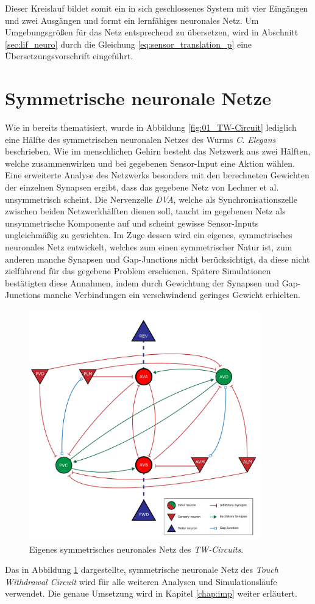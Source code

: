 	Dieser Kreislauf bildet somit ein in sich geschlossenes System mit vier Eingängen und zwei Ausgängen und formt ein lernfähiges neuronales Netz. Um Umgebungsgrößen für das Netz entsprechend zu übersetzen, wird in Abschnitt \ref{sec:lif_neuro} durch die Gleichung \eqref{eq:sensor_translation_p} eine Übersetzungsvorschrift eingeführt.
\section{Symmetrische neuronale Netze}
\label{sec:my_net}
	Wie in \cite{Wicks1996} bereits thematisiert, wurde in Abbildung \ref{fig:01_TW-Circuit} lediglich eine Hälfte des symmetrischen neuronalen Netzes des Wurms \textit{C. Elegans} beschrieben. Wie im menschlichen Gehirn besteht das Netzwerk aus zwei Hälften, welche zusammenwirken und bei gegebenen Sensor-Input eine Aktion wählen. Eine erweiterte Analyse des Netzwerks besonders mit den berechneten Gewichten der einzelnen Synapsen ergibt, dass das gegebene Netz von Lechner et al. unsymmetrisch scheint. Die Nervenzelle \textit{DVA}, welche als Synchronisationszelle zwischen beiden Netzwerkhälften dienen soll, taucht im gegebenen Netz als unsymmetrische Komponente auf und scheint gewisse Sensor-Inputs ungleichmäßig zu gewichten. Im Zuge dessen wird ein eigenes, symmetrisches neuronales Netz entwickelt, welches zum einen symmetrischer Natur ist, zum anderen manche Synapsen und Gap-Junctions nicht berücksichtigt, da diese nicht zielführend für das gegebene Problem erschienen. Spätere Simulationen bestätigten diese Annahmen, indem durch Gewichtung der Synapsen und Gap-Junctions manche Verbindungen ein verschwindend geringes Gewicht erhielten.
	\begin{figure}[H] %
		\centering
		\includegraphics[width=10cm]{figures/chap_neuron/Neural_Net_v3_plain.pdf}
		\caption{Eigenes symmetrisches neuronales Netz des \textit{TW-Circuits}.}
		\label{fig:nn_new}
	\end{figure}
	Das in Abbildung \ref{fig:nn_new} dargestellte, symmetrische neuronale Netz des \textit{Touch Withdrawal Circuit} wird für alle weiteren Analysen und Simulationsläufe verwendet. Die genaue Umsetzung wird in Kapitel \ref{chap:imp} weiter erläutert.
	

